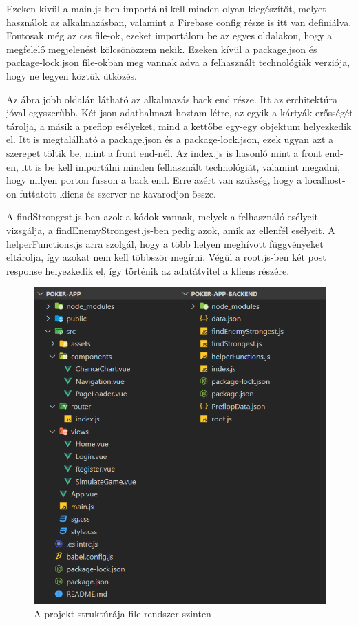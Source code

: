 Ezeken kívül a main.js-ben importálni kell minden olyan kiegészítőt, melyet használok az alkalmazásban, valamint a Firebase config része is itt van definiálva. Fontosak még az css file-ok, ezeket importálom be az egyes oldalakon, hogy a megfelelő megjelenést kölcsönözzem nekik. Ezeken kívül a package.json és package-lock.json file-okban meg vannak adva a felhasznált technológiák verziója, hogy ne legyen köztük ütközés.

Az ábra jobb oldalán látható az alkalmazás back end része. Itt az erchitektúra jóval egyszerűbb. Két json adathalmazt hoztam létre, az egyik a kártyák erősségét tárolja, a másik a preflop esélyeket, mind a kettőbe egy-egy objektum helyezkedik el. Itt is megtalálható a package.json és a package-lock.json, ezek ugyan azt a szerepet töltik be, mint a front end-nél. Az index.js is hasonló mint a front end-en, itt is be kell importálni minden felhasznált technológiát, valamint megadni, hogy milyen porton fusson a back end. Erre azért van szükség, hogy a localhost-on futtatott kliens és szerver ne kavarodjon össze.

A findStrongest.js-ben azok a kódok vannak, melyek a felhasználó esélyeit vizsgálja, a findEnemyStrongest.js-ben pedig azok, amik az ellenfél esélyeit. A helperFunctions.js arra szolgál, hogy a több helyen meghívott függvényeket eltárolja, így azokat nem kell többször megírni. Végül a root.js-ben két post response helyezkedik el, így történik az adatátvitel a kliens részére.

\begin{figure}[h]
\centering
\includegraphics[scale=0.8]{images/frontend-backend-arch.png}
\caption{A projekt struktúrája file rendszer szinten}
\label{fig:frontend-backend-arch}
\end{figure}

